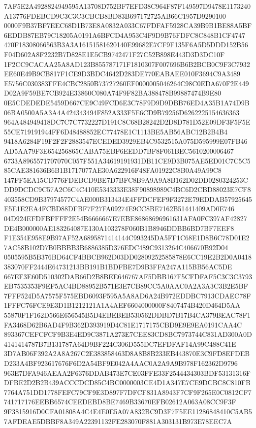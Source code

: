 \documentclass[UTF8,fontset=fandol,zihao=-4,a4paper]{ctexart}
\begin{document}
{{7AF5E2A4928824949595A13708D752BF7EFD38C964F87F149597D9478E1173240A13776FDEBCD9C3C3C3CBCB8BD83B697172725AB66C1957D9290100
0000F9B37BF7EEC68D1B73E8A0832A033C67FDFAF5928CA39B9B1BE88A5BF6EDDB87EB79C18205A0191A6BFCD4A953C4F9D9B76FDFC8C848B1CF4747
470F18308066563B3A3A16151581620140E99682E7CF9F135F6A5D5DDD152B56F04D602A8F2232B7D828E1E5CB9742471F27C52B898E443D3D3DC10F
1F2CC9CACAA25A8AD123B855787171F1810307F007696B6B2BCB0C9F3C7932EE60E49B9CB817F1CE9D3BDC4642D283DE770EABAEE010F3694C9A3489
E5756C030383FFE4CBC2850B73727260EF0000005046264C98C0EDA670F2E449D02A9F59BE7CB924E33860C080A74F9F82BA388478B99887474B9E80
0E5CDEDEDE5459D667CE9C49FCD6E3C78F9D9D9DBB76ED4A35B1A74D9B06BA0500A5A3A4A424343494F852A333F5E6CD9B79256D6262225154636363
964A484949418DC7C7C7732227D191C8C68B28242D2D8D781D52E09DF3F5F5E55CE719191944FF6D48488852EC77478E1C1113BE5AB56ABC12B2B4B4
9418A6284F19F2F2F2883547ECEDED3929EB4C9532515A075D595999E07FB46AD5AA79F3E654256865CABA75EBF6EEDD7BF8F061BEC5610200006467
6733A8965571707070C057F551A34619191931DB11CE9D3B075AE5ED01C7C5C585CAE381636B6B1B1717077AE30A622916F48FA01922C8B0A49A99C8
147FF5EA15CD776FDEBCD9BE7D7BFC8B9A9A9A8B162D02DD0280324253CDD9DCDC9C57A2C6C4C410E5343333E38F90898989C4BC6D2CBD88023E7CF8
403558CD9B37974577C4AE000B313434E4FFDCFEF9F3272E79EDDAB57925645E5E1E2EA4FCBD88DFBF7F27FA09274E9CC8BE7162B51441409AD0E746
04D924EFDFBFFFF2E54B6666667E7EBE86868696961631AFA0FC397AF42827DE4B000000AE183264087E130A103278F060B1B8946DDBB6BD7BF7EEF8
F1E354E958E9B97AF52A6895871414144C993245DA5FF1C68E1D8B6C78D01E27AC58B102D7B0BBBB3B6886385D376EDC489C9313264C406670B92D04
0505595B5B376BD64CF4BBCB962D03DD02809252585878E6CC19E2B2D0A0418383070FF2444E64731213BB191B1BDFBE7D9B3FFA247A115BB56AC5DE
667EF3E60D510302DAB66D2B8BEE646767AF5DBB167F5CFDFAF5C3C3C3793EB7535353F9EF5AC4BD88952B571E3E7CB89CC5A0AAC0A2A3A3C3B2E5BF
7FFF524D5A7575F575EBD6093F595A5A8AD6A24B972EDDBC7913CDAEC78F1FFFC76FCE9E3D1B1212121A1A4AEF6604000000F8407474B420D464D5AA
55870F1F162D566E656545B5D4EBEBEB530562DDBD7B17B4CA379BEAC78F1FA3468D62B6AD4F9B362D393919D4C81E1717175CBD9E9E9EA0191CAA4C
893367CEFCFCF9B3E4ED9C3871A273E7CEE83CD8BC7973744C831AD300A0D4141414787B7B131787A64D9BF224C306D555DC7EFDFAF14A99C488C41E
3D7AB06F392A2A8A267C2E383858463D8A8B8B233EB443870E3C9FD8EFDEBD233A4BF923617676F6D2A54BF9E042A4AAC0A2A9A9B978F162362D9796
963E7DFA946AEAA2F6376DDAB473E7CE03FFE33F2544434303BDF53131316FDFBE2D2B2B439ACCCDCD85C4BC0000003CE4D1A347E7CE9DCBC8C810FB
7764A751DD1778FEFC79CF9E3D897F7DFCF831A8943F7CF9F265E0C0812CF7741717176EEBB6574CEEDEBD8BE7469B33670EFB02612A063A08CC9F3F
9F3815916D0CFA01808A4C4E4E0E5A07A832BC9D3F7F5EE11286848410C5AB57AFDEAE5DBBF8A349A22391132FE283070F881A303131B973E78EEC7A
}}
\end{document}
